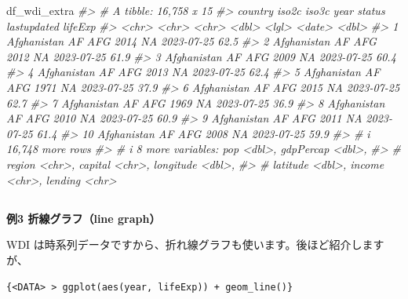 \documentclass[
  xelatex, ja=standard]{bxjsbook}
\newenvironment{Shaded}{\begin{snugshade}}{\end{snugshade}}
\newcommand{\CommentTok}[1]{\textcolor[rgb]{0.56,0.35,0.01}{\textit{#1}}}
\newcommand{\NormalTok}[1]{#1}
\theoremstyle{definition}
\theoremstyle{definition}
\theoremstyle{definition}
\theoremstyle{definition}
\theoremstyle{remark}
\begin{document}
\begin{Shaded}
\begin{Highlighting}[]
\NormalTok{df\_wdi\_extra}
\CommentTok{\#\textgreater{} \# A tibble: 16,758 x 15}
\CommentTok{\#\textgreater{}    country     iso2c iso3c  year status lastupdated lifeExp}
\CommentTok{\#\textgreater{}    \textless{}chr\textgreater{}       \textless{}chr\textgreater{} \textless{}chr\textgreater{} \textless{}dbl\textgreater{} \textless{}lgl\textgreater{}  \textless{}date\textgreater{}        \textless{}dbl\textgreater{}}
\CommentTok{\#\textgreater{}  1 Afghanistan AF    AFG    2014 NA     2023{-}07{-}25     62.5}
\CommentTok{\#\textgreater{}  2 Afghanistan AF    AFG    2012 NA     2023{-}07{-}25     61.9}
\CommentTok{\#\textgreater{}  3 Afghanistan AF    AFG    2009 NA     2023{-}07{-}25     60.4}
\CommentTok{\#\textgreater{}  4 Afghanistan AF    AFG    2013 NA     2023{-}07{-}25     62.4}
\CommentTok{\#\textgreater{}  5 Afghanistan AF    AFG    1971 NA     2023{-}07{-}25     37.9}
\CommentTok{\#\textgreater{}  6 Afghanistan AF    AFG    2015 NA     2023{-}07{-}25     62.7}
\CommentTok{\#\textgreater{}  7 Afghanistan AF    AFG    1969 NA     2023{-}07{-}25     36.9}
\CommentTok{\#\textgreater{}  8 Afghanistan AF    AFG    2010 NA     2023{-}07{-}25     60.9}
\CommentTok{\#\textgreater{}  9 Afghanistan AF    AFG    2011 NA     2023{-}07{-}25     61.4}
\CommentTok{\#\textgreater{} 10 Afghanistan AF    AFG    2008 NA     2023{-}07{-}25     59.9}
\CommentTok{\#\textgreater{} \# i 16,748 more rows}
\CommentTok{\#\textgreater{} \# i 8 more variables: pop \textless{}dbl\textgreater{}, gdpPercap \textless{}dbl\textgreater{},}
\CommentTok{\#\textgreater{} \#   region \textless{}chr\textgreater{}, capital \textless{}chr\textgreater{}, longitude \textless{}dbl\textgreater{},}
\CommentTok{\#\textgreater{} \#   latitude \textless{}dbl\textgreater{}, income \textless{}chr\textgreater{}, lending \textless{}chr\textgreater{}}
\end{Highlighting}
\end{Shaded}

\hypertarget{section-1}{%
\subsection{}\label{section-1}}

\textbf{例3 折線グラフ（line graph）}

WDI は時系列データですから、折れ線グラフも使います。後ほど紹介しますが、

\texttt{\{\textless{}DATA\textgreater{}\ \textbar{}\textgreater{}\ ggplot(aes(year,\ lifeExp))\ +\ geom\_line()\}}
\end{document}
